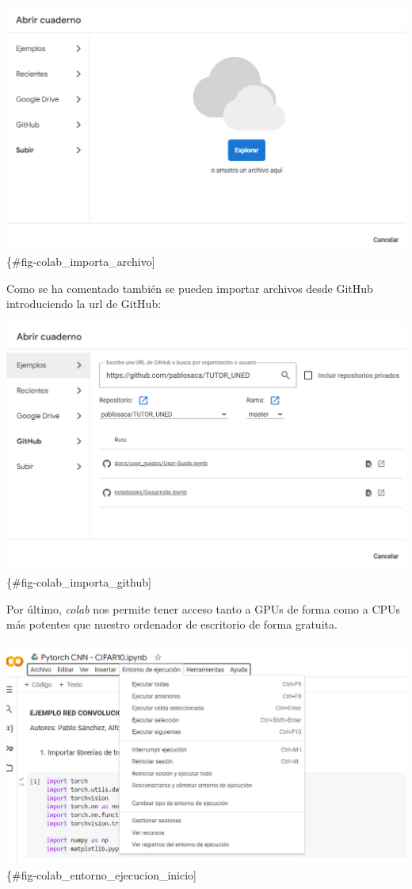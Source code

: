 \documentclass[
  a4paper,
  DIV=11,
  numbers=noendperiod]{scrreprt}
\begin{document}
\includegraphics{imagenes/capitulo1/colab_importa_archivo.png}\{\#fig-colab\_importa\_archivo{]}

Como se ha comentado también se pueden importar archivos desde GitHub
introduciendo la url de GitHub:

\includegraphics{imagenes/capitulo1/colab_importa_github.png}\{\#fig-colab\_importa\_github{]}

Por último, \emph{colab} nos permite tener acceso tanto a GPUs de forma
como a CPUs más potentes que nuestro ordenador de escritorio de forma
gratuita.

\includegraphics{imagenes/capitulo1/colab_entorno_ejecucion_inicio.png}\{\#fig-colab\_entorno\_ejecucion\_inicio{]}
\end{document}

